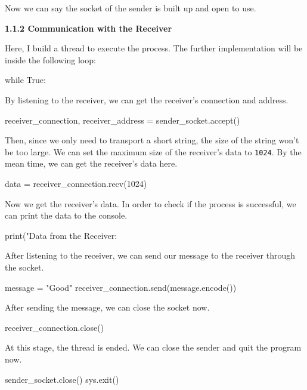 \documentclass{article}%
\newenvironment{code}%
   {\snugshade\verbatim}%
   {\endverbatim\endsnugshade}
\begin{document}
\begin{Large}
\newpage

Now we can say the socket of the sender is built up and open to use.

\begin{flushleft}
\textbf{1.1.2 Communication with the Receiver}
\end{flushleft}

Here, I build a thread to execute the process. The further implementation will be inside the following loop:

\begin{code}
    while True:
\end{code}

By listening to the receiver, we can get the receiver's connection and address.

\begin{code}
    receiver_connection, receiver_address = sender_socket.accept()
\end{code}

Then, since we only need to transport a short string, the size of the string won't be too large. We can set the maximum size of the receiver's data to \texttt{1024}. By the mean time, we can get the receiver's data here.

\begin{code}
    data = receiver_connection.recv(1024)
\end{code}

Now we get the receiver's data. In order to check if the process is successful, we can print the data to the console.

\begin{code}
    print("Data from the Receiver: %
\end{code}

After listening to the receiver, we can send our message to the receiver through the socket.

\begin{code}
    message = "Good"
    receiver_connection.send(message.encode())
\end{code}

After sending the message, we can close the socket now.

\begin{code}
    receiver_connection.close()
\end{code}

At this stage, the thread is ended. We can close the sender and quit the program now.

\begin{code}
    sender_socket.close()
    sys.exit()
\end{code}


\end{Large}
\end{document}
